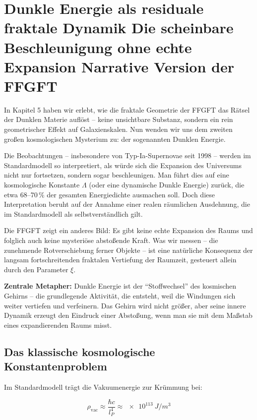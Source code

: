 \chapter{Dunkle Energie als residuale fraktale Dynamik  Die scheinbare Beschleunigung ohne echte Expansion  Narrative Version der FFGFT}


	
	In Kapitel 5 haben wir erlebt, wie die fraktale Geometrie der FFGFT das Rätsel der Dunklen Materie auflöst – keine unsichtbare Substanz, sondern ein rein geometrischer Effekt auf Galaxienskalen. Nun wenden wir uns dem zweiten großen kosmologischen Mysterium zu: der sogenannten Dunklen Energie.
	
	Die Beobachtungen – insbesondere von Typ-Ia-Supernovae seit 1998 – werden im Standardmodell so interpretiert, als würde sich die Expansion des Universums nicht nur fortsetzen, sondern sogar beschleunigen. Man führt dies auf eine kosmologische Konstante \(\Lambda\) (oder eine dynamische Dunkle Energie) zurück, die etwa 68–70\,\% der gesamten Energiedichte ausmachen soll. Doch diese Interpretation beruht auf der Annahme einer realen räumlichen Ausdehnung, die im Standardmodell als selbstverständlich gilt.
	
	Die FFGFT zeigt ein anderes Bild: Es gibt keine echte Expansion des Raums und folglich auch keine mysteriöse abstoßende Kraft. Was wir messen – die zunehmende Rotverschiebung ferner Objekte – ist eine natürliche Konsequenz der langsam fortschreitenden fraktalen Vertiefung der Raumzeit, gesteuert allein durch den Parameter \(\xi\).
	
	\textbf{Zentrale Metapher:} Dunkle Energie ist der \enquote{Stoffwechsel} des kosmischen Gehirns – die grundlegende Aktivität, die entsteht, weil die Windungen sich weiter vertiefen und verfeinern. Das Gehirn wird nicht größer, aber seine innere Dynamik erzeugt den Eindruck einer Abstoßung, wenn man sie mit dem Maßstab eines expandierenden Raums misst.
	
	\section{Das klassische kosmologische Konstantenproblem}
	
	Im Standardmodell trägt die Vakuumenergie zur Krümmung bei:
	
	\begin{equation}
		\rho_{\text{vac}} \approx \frac{\hbar c}{l_P^4} \approx \SI{e113}{J/m^3}
	\end{equation}
	
